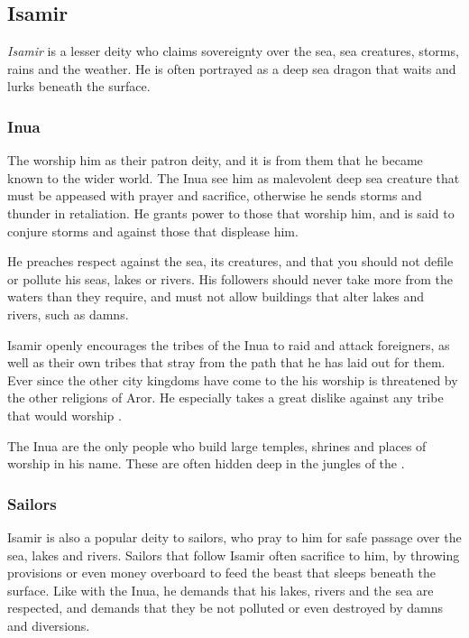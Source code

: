 \subsection{Isamir}
\label{sec:Isamir}

\emph{Isamir} is a lesser deity who claims sovereignty over the sea, sea
creatures, storms, rains and the weather. He is often portrayed as a deep
sea dragon that waits and lurks beneath the surface.

\subsubsection{Inua}

The  worship him as their patron deity, and it is from
them that he became known to the wider world. The Inua see him as malevolent
deep sea creature that must be appeased with prayer and sacrifice, otherwise
he sends storms and thunder in retaliation. He grants power to those that
worship him, and is said to conjure storms and against those that displease
him.

He preaches respect against the sea, its creatures, and that you should not
defile or pollute his seas, lakes or rivers. His followers should never take
more from the waters than they require, and must not allow buildings that
alter lakes and rivers, such as damns.

Isamir openly encourages the tribes of the Inua to raid and attack foreigners,
as well as their own tribes that stray from the path that he has laid out for
them. Ever since the other city kingdoms have come to the
 his worship is threatened by the other religions
of Aror. He especially takes a great dislike against any tribe that would
worship .

The Inua are the only people who build large temples, shrines and places of
worship in his name. These are often hidden deep in the jungles of the
.

\subsubsection{Sailors}

Isamir is also a popular deity to sailors, who pray to him for safe passage
over the sea, lakes and rivers. Sailors that follow Isamir often sacrifice
to him, by throwing provisions or even money overboard to feed the beast
that sleeps beneath the surface. Like with the Inua, he demands that his
lakes, rivers and the sea are respected, and demands that they be not
polluted or even destroyed by damns and diversions.

